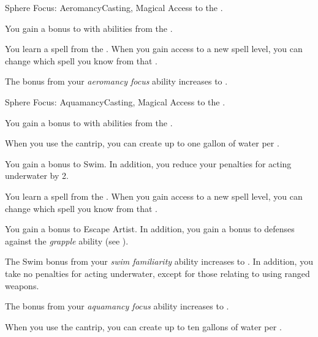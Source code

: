     \begin{feat}{Sphere Focus: Aeromancy}{Casting, Magical}
        \featpre Access to the  .

         You gain a  bonus to  with abilities from the  .

         You learn a spell from the  .
        When you gain access to a new spell level, you can change which spell you know from that .

         The bonus from your \textit{aeromancy focus} ability increases to .
    \end{feat}

    \begin{feat}{Sphere Focus: Aquamancy}{Casting, Magical}
        \featpre Access to the  .

         You gain a  bonus to  with abilities from the  .

         When you use the  cantrip, you can create up to one gallon of water per .

         You gain a  bonus to Swim.
        In addition, you reduce your penalties for acting underwater by 2.

         You learn a spell from the  .
        When you gain access to a new spell level, you can change which spell you know from that .

         You gain a  bonus to Escape Artist.
        In addition, you gain a  bonus to defenses against the \textit{grapple} ability (see ).

         The Swim bonus from your \textit{swim familiarity} ability increases to .
        In addition, you take no penalties for acting underwater, except for those relating to using ranged weapons.

         The bonus from your \textit{aquamancy focus} ability increases to .

         When you use the  cantrip, you can create up to ten gallons of water per .
    \end{feat}

